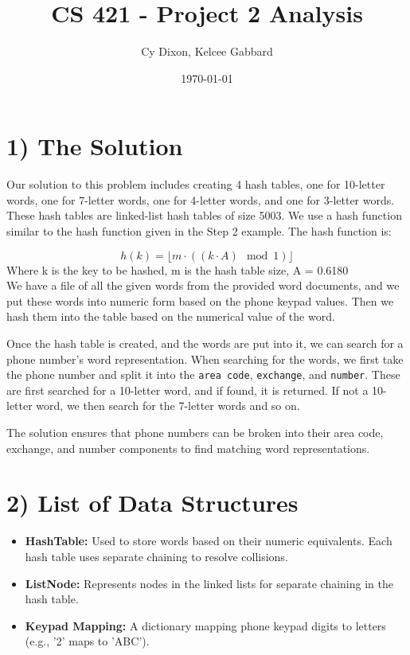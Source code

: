 \documentclass{article}
\author{Cy Dixon, Kelcee Gabbard}
\title{CS 421 - Project 2 Analysis}
\date{\today}
\begin{document}
\maketitle

\thispagestyle{fancy}

\section*{1) The Solution}
Our solution to this problem includes creating 4 hash tables, one for 10-letter words, one for 7-letter words, one for 4-letter words, and one for 3-letter words. These hash tables are linked-list hash tables of size 5003. We use a hash function similar to the hash function given in the Step 2 example. The hash function is:

\[
h(k) = \lfloor m \cdot ((k \cdot A) \mod 1) \rfloor
\]
Where k is the key to be hashed, m is the hash table size, A = 0.6180
\\
We have a file of all the given words from the provided word documents, and we put these words into numeric form based on the phone keypad values. Then we hash them into the table based on the numerical value of the word.

Once the hash table is created, and the words are put into it, we can search for a phone number's word representation. When searching for the words, we first take the phone number and split it into the \texttt{area code}, \texttt{exchange}, and \texttt{number}. These are first searched for a 10-letter word, and if found, it is returned. If not a 10-letter word, we then search for the 7-letter words and so on.

The solution ensures that phone numbers can be broken into their area code, exchange, and number components to find matching word representations.

\section*{2) List of Data Structures}
\begin{itemize}
    \item \textbf{HashTable:} Used to store words based on their numeric equivalents. Each hash table uses separate chaining to resolve collisions.
    \item \textbf{ListNode:} Represents nodes in the linked lists for separate chaining in the hash table.
    \item \textbf{Keypad Mapping:} A dictionary mapping phone keypad digits to letters (e.g., '2' maps to 'ABC').
\end{itemize}
\end{document}
